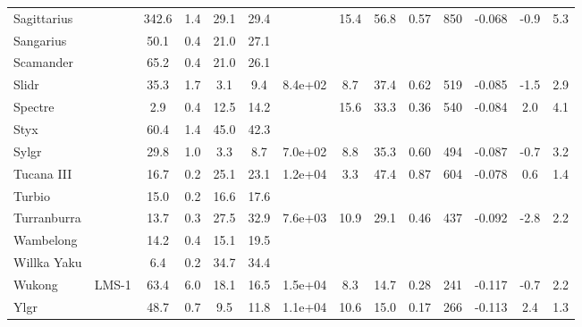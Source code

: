 \begin{tabular}{llSSSSSSSSrSSS}
Sagittarius &  & 342.6 & 1.4 & 29.1 & 29.4 &  & 15.4 & 56.8 & 0.57 & 850 & -0.068 & -0.9 & 5.3 \\
Sangarius &  & 50.1 & 0.4 & 21.0 & 27.1 &  &  &  &  &  &  &  &  \\
Scamander &  & 65.2 & 0.4 & 21.0 & 26.1 &  &  &  &  &  &  &  &  \\
Slidr &  & 35.3 & 1.7 & 3.1 & 9.4 & 8.4e+02 & 8.7 & 37.4 & 0.62 & 519 & -0.085 & -1.5 & 2.9 \\
Spectre &  & 2.9 & 0.4 & 12.5 & 14.2 &  & 15.6 & 33.3 & 0.36 & 540 & -0.084 & 2.0 & 4.1 \\
Styx &  & 60.4 & 1.4 & 45.0 & 42.3 &  &  &  &  &  &  &  &  \\
Sylgr &  & 29.8 & 1.0 & 3.3 & 8.7 & 7.0e+02 & 8.8 & 35.3 & 0.60 & 494 & -0.087 & -0.7 & 3.2 \\
Tucana III &  & 16.7 & 0.2 & 25.1 & 23.1 & 1.2e+04 & 3.3 & 47.4 & 0.87 & 604 & -0.078 & 0.6 & 1.4 \\
Turbio &  & 15.0 & 0.2 & 16.6 & 17.6 &  &  &  &  &  &  &  &  \\
Turranburra &  & 13.7 & 0.3 & 27.5 & 32.9 & 7.6e+03 & 10.9 & 29.1 & 0.46 & 437 & -0.092 & -2.8 & 2.2 \\
Wambelong &  & 14.2 & 0.4 & 15.1 & 19.5 &  &  &  &  &  &  &  &  \\
Willka Yaku &  & 6.4 & 0.2 & 34.7 & 34.4 &  &  &  &  &  &  &  &  \\
Wukong & LMS-1 & 63.4 & 6.0 & 18.1 & 16.5 & 1.5e+04 & 8.3 & 14.7 & 0.28 & 241 & -0.117 & -0.7 & 2.2 \\
Ylgr &  & 48.7 & 0.7 & 9.5 & 11.8 & 1.1e+04 & 10.6 & 15.0 & 0.17 & 266 & -0.113 & 2.4 & 1.3 \\
\hline
\end{tabular}